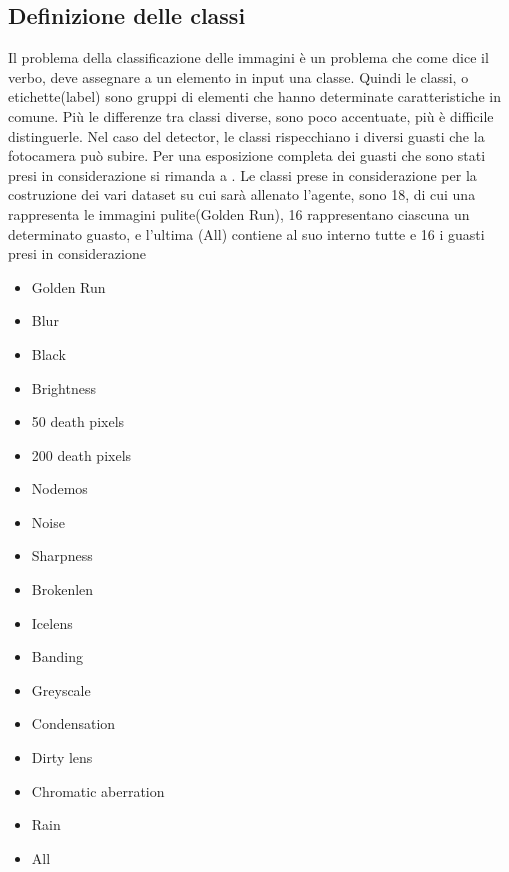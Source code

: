 \documentclass[14pt]{extarticle}
\begin{document}
\subsection{Definizione delle classi}
Il problema della classificazione delle immagini è un problema che come dice il verbo, deve assegnare a un elemento in input una classe.
Quindi le classi, o etichette(label) sono gruppi di elementi che hanno determinate caratteristiche in comune. Più le differenze tra classi diverse, sono poco accentuate, più è difficile distinguerle.
Nel caso del detector,  le classi rispecchiano i diversi guasti che la fotocamera può subire. Per una esposizione completa dei guasti che sono stati presi in considerazione si rimanda a \cite{secci2020failures}.
Le classi prese in considerazione per la costruzione dei vari dataset su cui sarà allenato l'agente, sono 18, di cui una rappresenta le immagini pulite(Golden Run), 16 rappresentano ciascuna un determinato guasto, e l'ultima (All) contiene al suo interno tutte e 16 i guasti presi in considerazione
\begin{multicols}{3}
\begin{itemize}
\item Golden Run
\item Blur
\item Black
\item Brightness
\item 50 death pixels
\item 200 death pixels
\item Nodemos
\item Noise
\item Sharpness
\item Brokenlen
\item Icelens
\item Banding
\item Greyscale
\item Condensation
\item Dirty lens
\item Chromatic aberration
\item Rain
\item All
\end{itemize}
\end{multicols}
\end{document}
